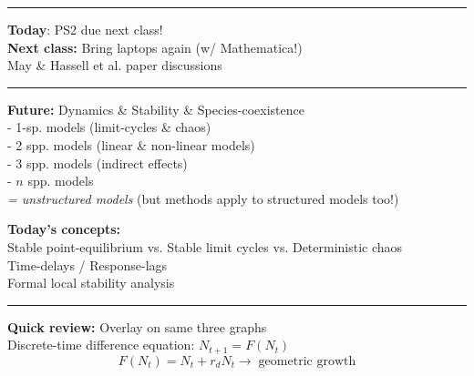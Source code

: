 \documentclass{article}
\newcommand{\note}[1]{\colorbox{gray!30}{#1}}
\newcommand{\ind}{\-\hspace{1cm}}
\begin{document}
\noindent{}
\rule[0.5ex]{\linewidth}{1pt}
\textbf{Today}: PS2 due next class!\\
\textbf{Next class:} Bring laptops again (w/ Mathematica!)\\
\ind \ind May \& Hassell et al. paper discussions\\
\rule[0.5ex]{\linewidth}{1pt}
\textbf{Future:}
Dynamics \& Stability \& Species-coexistence\\
\ind \ind - 1-sp. models (limit-cycles \& chaos)\\
\ind \ind - 2 spp. models (linear \& non-linear models)\\
\ind \ind - 3 spp. models (indirect effects)\\
\ind \ind - $n$ spp. models\\
\ind \emph{ = unstructured models} (but methods apply to structured models too!)

\textbf{Today's concepts:}\\
\ind Stable point-equilibrium vs. Stable limit cycles vs. Deterministic chaos\\
\ind Time-delays / Response-lags\\
\ind Formal local stability analysis

\rule[0.5ex]{\linewidth}{1pt}

\textbf{Quick review:} \note{Overlay on same three graphs}\\
Discrete-time difference equation: $N_{t+1}=F(N_t)$
\begin{equation*}
	F(N_t)=N_t + r_d N_t \to \; \text{geometric growth}
\end{equation*}
\end{document}
